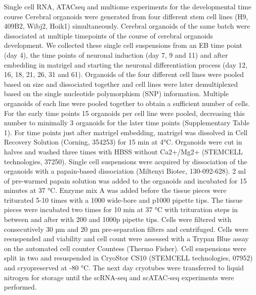 Single cell RNA, ATACseq and multiome experiments for the developmental time course
Cerebral organoids were generated from four different stem cell lines (H9, 409B2, Wibj2, Hoik1) simultaneously. Cerebral organoids of the same batch were dissociated at multiple timepoints of the course of cerebral organoids development. We collected these single cell suspensions from an EB time point (day 4), the time points of neuronal induction (day 7, 9 and 11) and after embedding in matrigel and starting the neuronal differentiation process (day 12, 16, 18, 21, 26, 31 and 61). Organoids of the four different cell lines were pooled based on size and dissociated together and cell lines were later demultiplexed based on the single nucleotide polymorphism (SNP) information. Multiple organoids of each line were pooled together to obtain a sufficient number of cells. For the early time points 15 organoids per cell line were pooled, decreasing this number to minimally 3 organoids for the later time points (Supplementary Table 1). For time points just after matrigel embedding, matrigel was dissolved in Cell Recovery Solution (Corning, 354253)​​ for 15 min at 4°C. Organoids were cut in halves and washed three times with HBSS without Ca2+/Mg2+ (STEMCELL technologies, 37250). Single cell suspensions were acquired by dissociation of the organoids with a papain-based dissociation (Miltenyi Biotec, 130-092-628). 2 ml of pre-warmed papain solution was added to the  organoids and incubated for 15 minutes at 37 °C. Enzyme mix A was added before the tissue pieces were triturated 5-10 times with a 1000 wide-bore and p1000 pipette tips.  The tissue pieces were incubated two times for 10 min at 37 °C with trituration steps in between and after with 200 and 1000p pipette tips. Cells were filtered with consecutively 30 µm and 20 µm pre-separation filters and centrifuged. Cells were resuspended and viability and cell count were assessed with a Trypan Blue assay on the automated cell counter Countess (Thermo Fisher). Cell suspensions were split in two and resuspended in CryoStor CS10 (STEMCELL technologies, 07952) and cryopreserved at -80 °C. The next day cryotubes were transferred to liquid nitrogen for storage until the scRNA-seq and scATAC-seq experiments were performed.

